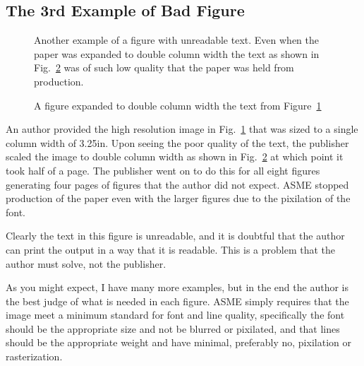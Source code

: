 \documentclass[10pt]{asme2ej}
\begin{document}
\subsection{The 3rd Example of Bad Figure}
\begin{figure} 
\centerline{}
\caption{Another example of a figure with unreadable text.  Even when the paper was expanded to double column width the text as shown in Fig.~\ref{fig_example4.ps} was of such low quality that the paper was held from production.}
\label{fig_example3.ps}
\end{figure}

\begin{figure} 
\centerline{}
\caption{A figure expanded to double column width the text from Figure~\ref{fig_example3.ps}}
\label{fig_example4.ps}
\end{figure}
An author provided the high resolution image 
in Fig.~\ref{fig_example3.ps}
that was sized to a single column width of 3.25in.  Upon seeing the poor quality of the text, the publisher scaled the image to double column width as shown in Fig.~\ref{fig_example4.ps} 
at which point it took half of a page.  The publisher went on to do this for all eight figures generating four pages of figures that the author did not expect. ASME stopped production of the paper even with the larger figures due to the pixilation of the font.

Clearly the text in this figure is unreadable, and it is doubtful that the author can print the output in a way that it is readable.  This is a problem that the author must solve, not the publisher. 

As you might expect, I have many more examples, but in the end the author is the best judge of what is needed in each figure.  ASME simply requires that the image meet a minimum standard for font and line quality, specifically the font should be the appropriate size and not be blurred or pixilated, and that lines should be the appropriate weight and have minimal, preferably no, pixilation or rasterization.
\end{document}

